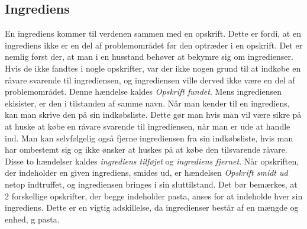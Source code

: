 \subsection{Ingrediens}

En ingrediens kommer til verdenen sammen med en opskrift. Dette er fordi, at en ingrediens ikke er en del af problemområdet før den optræder i en opskrift. Det er nemlig først der, at man i en husstand behøver at bekymre sig om ingredienser. Hvis de ikke fandtes i nogle opskrifter, var der ikke nogen grund til at indkøbe en råvare svarende til ingrediensen, og ingrediensen ville derved ikke være en del af problemområdet. Denne hændelse kaldes \textit{Opskrift fundet}. Mens ingrediensen ekisister, er den i tilstanden af samme navn. Når man kender til en ingrediens, kan man skrive den på sin indkøbsliste. Dette gør man hvis man vil være sikre på at huske at købe en råvare svarende til ingrediensen, når man er ude at handle ind. Man kan selvfølgelig også fjerne ingrediensen fra sin indkøbsliste, hvis man har ombestemt sig og ikke ønsker at huskes på at købe den tilsvarende råvare. Disse to hændelser kaldes \textit{ingrediens tilføjet} og \textit{ingrediens fjernet}. Når opskriften, der indeholder en given ingrediens, smides ud, er hændelsen \textit{Opskrift smidt ud} netop indtruffet, og ingrediensen bringes i sin sluttilstand. Det bør bemærkes, at 2 forskellige opskrifter, der begge indeholder pasta, anses for at indeholde hver sin ingrediens. Dette er en vigtig adskillelse, da ingredienser består af en mængde og enhed,  g pasta.

\begin{figure}[H]
	\centering
	\scalebox{0.6}{
	}
	\label{fig:ingrediens-adfaerd}
\end{figure}